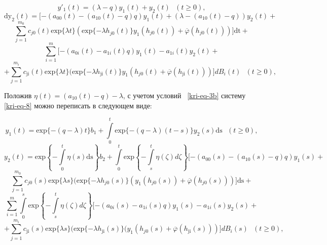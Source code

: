 \begin{equation*}
	y'_{1}(t)=(\lambda -q)y_1(t)+y_2(t)\text{   }(t\ge 0),
\end{equation*}
\begin{equation*}	
	\text{dy}_2(t)=[-(a_{00}(t)-(a_{10}(t)-q)q)y_1(t)+(\lambda -(a_{10}(t)-q))y_2(t)+
\end{equation*}
\begin{equation}\label{kri-eq-8}	
	\overset{m_0}{\underset{j=1}{\sum }}c_{\mathit{j0}}(t)\text{exp}\{\mathit{\lambda t}\}(\text{exp}\{-\mathit{\lambda
		h}_{\mathit{j0}}(t)\}y_1(h_{\mathit{j0}}(t))+\overline{\varphi
	}(h_{\mathit{j0}}(t)))]\text{dt}+ 
\end{equation}
\begin{equation*}
	\overset m{\underset{i=1}{\sum
	}}[-(a_{0i}(t)-a_{1i}(t)q)y_1(t)-a_{1i}(t)y_2(t)+ 
\end{equation*}
\begin{equation*}
	+\overset{m_i}{\underset{j=1}{\sum
	}}c_{\text{ji}}(t)\text{exp}\{\mathit{\lambda t}\}(\text{exp}\{-\mathit{\lambda
		h}_{\text{ji}}(t)\}y_1(h_{\mathit{j0}}(t)+\overline{\varphi
	}(h_{\text{ji}}(t)))]\mathit{dB}_i(t)\text{  }(t\ge 0),
\end{equation*}

Положив  $\eta (t)=(a_{10}(t)-q)-\lambda $, с учетом условий \ \eqref{kri-eq-3b} систему \eqref{kri-eq-8} можно переписать в следующем виде:

\begin{equation*}
	y_1(t)=\text{exp}\{-(q-\lambda )t\}b_1+\overset t{\underset 0{\int }}\text{exp}\{-(q-\lambda
	)(t-s)\}y_2(s)\text{ds}\text{   }(t\ge 0),
\end{equation*}
\begin{equation*}		
	y_2(t)=\text{exp}\left\{-\overset t{\underset 0{\int }}\eta (s)\text{ds}\right\}b_2+\overset
	t{\underset 0{\int }}\text{exp}\left\{-\overset t{\underset s{\int }}\eta (\zeta )\mathit{d\zeta
	}\right\}[-(a_{00}(s)-(a_{10}(s)-q)q)y_1(s)+ 
\end{equation*}	
\begin{equation}\label{kri-eq-9}
	\overset{m_0}{\underset{j=1}{\sum
	}}c_{\mathit{j0}}(s)\text{exp}\{\mathit{\lambda s}\}(\text{exp}\{-\mathit{\lambda
		h}_{\mathit{j0}}(s)\}(y_1(h_{\mathit{j0}}(s))+\overline{\varphi
	}(h_{\mathit{j0}}(s)))]\text{ds}+ 
\end{equation}	
\begin{equation*}
	\overset m{\underset{i=1}{\sum }}\overset s{\underset
		0{\int }}\text{exp}\left\{-\overset t{\underset s{\int }}\eta (\zeta )\mathit{d\zeta
	}\right\}[-(a_{0i}(s)-a_{1i}(s)q)y_1(s)-a_{1i}(s)y_2(s)+ 
\end{equation*}	
\begin{equation*}
	+\overset{m_i}{\underset{j=1}{\sum
	}}c_{\text{ji}}(s)\text{exp}\{\mathit{\lambda s}\}(\text{exp}\{-\mathit{\lambda
		h}_{\text{ji}}(s)\}(y_1(h_{\mathit{j0}}(s)+\overline{\varphi
	}(h_{\text{ji}}(s)))]\mathit{dB}_i(s)\text{  }(t\ge 0),
\end{equation*}

